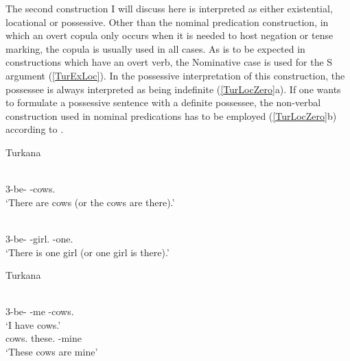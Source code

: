 The second construction I will discuss here is interpreted as either existential, locational or possessive.
Other than the nominal predication construction, in which an overt copula only occurs when it is needed to host negation or tense marking, the copula is usually used in all cases. 
As is to be expected in constructions which have an overt verb, the Nominative case is used for the S argument (\ref{TurExLoc}).
In the possessive interpretation of this construction, the possessee is always interpreted as being indefinite (\ref{TurLocZero}a). 
If one wants to formulate a possessive sentence with a definite possessee, the non-verbal construction used in nominal predications has to be employed (\ref{TurLocZero}b)  according to \citet[82]{Dimmendaal:1982}.
%


\begin{exe}\ex\label{TurExLoc} {Turkana} \citep[82]{Dimmendaal:1982}\nopagebreak[4]
\begin{xlist}
\ex\gll{} \\
3-be-\pl{} \NC{}-cows.\nom{}\\
\glt `There are cows (or the cows are there).'

\ex\gll{}  \\
3-be-\asp{} \NC{}-girl.\nom{} \NC{}-one.\nom{}\\
\glt `There is one girl (or one girl is there).'
\end{xlist}
\end{exe} %

\pagebreak
\begin{exe}
 \ex\label{TurLocZero} {Turkana} \citep[82]{Dimmendaal:1982}\nopagebreak[4]
\begin{xlist}
\ex\gll{}  \\
3-be-\pl{} \NC{}-me \NC{}-cows.\nom{}\\
\glt `I have cows.'
\ex\gll{}  \\
cows.\acc{} these.\acc{} \NC{}-mine\\
\glt `These cows are mine'
\end{xlist}
\end{exe}

